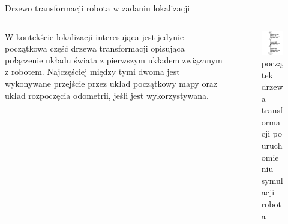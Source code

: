 \begin{frame}
{Drzewo transformacji robota w zadaniu lokalizacji}
	\begin{columns}
		\begin{column}{0.5\textwidth}
				W kontekście lokalizacji interesująca jest jedynie początkowa część drzewa transformacji opisująca połączenie układu świata z pierwszym układem związanym z robotem.
	Najczęściej między tymi dwoma jest wykonywane przejście przez układ początkowy mapy oraz układ rozpoczęcia odometrii, jeśli jest wykorzystywana.
		\end{column}
		\begin{column}{0.5\textwidth}  %
			\begin{figure}
				\begin{center}
					\includegraphics[height=0.6\textheight]{img/velma_tf.png} 
					\caption{początek drzewa transformacji po uruchomieniu symulacji robota}
				\end{center}
			\end{figure}
		\end{column}
	\end{columns}
\end{frame}

